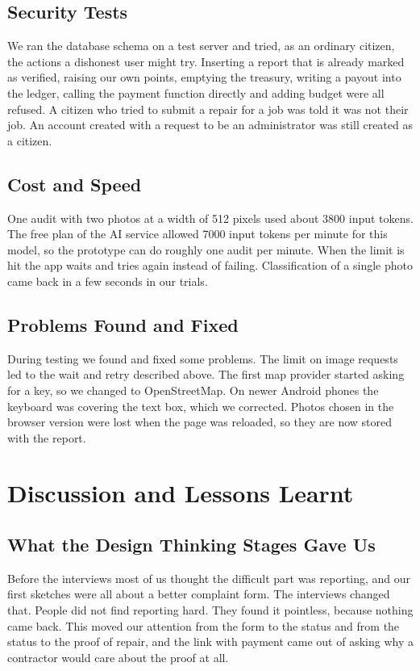 \documentclass[conference,a4paper]{IEEEtran}
\begin{document}
\subsection{Security Tests}
We ran the database schema on a test server and tried, as an ordinary citizen, the actions a dishonest user might try. Inserting a report that is already marked as verified, raising our own points, emptying the treasury, writing a payout into the ledger, calling the payment function directly and adding budget were all refused. A citizen who tried to submit a repair for a job was told it was not their job. An account created with a request to be an administrator was still created as a citizen.

\subsection{Cost and Speed}
One audit with two photos at a width of 512 pixels used about 3800 input tokens. The free plan of the AI service allowed 7000 input tokens per minute for this model, so the prototype can do roughly one audit per minute. When the limit is hit the app waits and tries again instead of failing. Classification of a single photo came back in a few seconds in our trials.

\subsection{Problems Found and Fixed}
During testing we found and fixed some problems. The limit on image requests led to the wait and retry described above. The first map provider started asking for a key, so we changed to OpenStreetMap. On newer Android phones the keyboard was covering the text box, which we corrected. Photos chosen in the browser version were lost when the page was reloaded, so they are now stored with the report.


\section{Discussion and Lessons Learnt}
\subsection{What the Design Thinking Stages Gave Us}
Before the interviews most of us thought the difficult part was reporting, and our first sketches were all about a better complaint form. The interviews changed that. People did not find reporting hard. They found it pointless, because nothing came back. This moved our attention from the form to the status and from the status to the proof of repair, and the link with payment came out of asking why a contractor would care about the proof at all.
\end{document}
